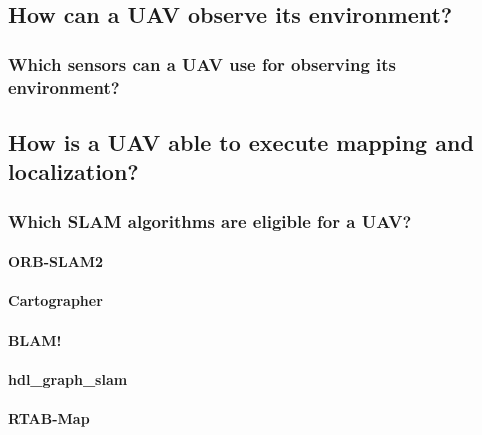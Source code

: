 \documentclass[12pt, a4paper]{report}
\begin{document}
      \subsection{How can a UAV observe its environment?}
      
      \clearpage
        \subsubsection{Which sensors can a UAV use for observing its environment?}
        
      \subsection{How is a UAV able to execute mapping and localization?}
      
      \clearpage
        \subsubsection{Which SLAM algorithms are eligible for a UAV?}
        
          \paragraph{ORB\hyp{}SLAM2}
          
          \clearpage
          \paragraph{Cartographer}
          
          \paragraph{BLAM!}
          
          \clearpage
          \paragraph{hdl\_graph\_slam}
          
          \clearpage
          \paragraph{RTAB\hyp{}Map}
          
          \clearpage
\end{document}

